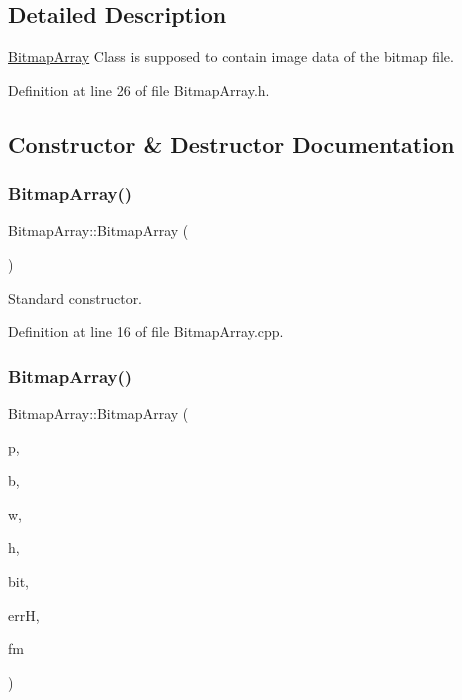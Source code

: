 \subsection{Detailed Description}
\mbox{\hyperlink{classBitmapArray}{Bitmap\+Array}} Class is supposed to contain image data of the bitmap file. 

Definition at line 26 of file Bitmap\+Array.\+h.



\subsection{Constructor \& Destructor Documentation}
\mbox{\label{classBitmapArray_a582e5e54ec078d30fde87ae7b4540f32}} 
\subsubsection{\texorpdfstring{BitmapArray()}{BitmapArray()}\hspace{0.1cm}{\footnotesize\ttfamily [1/4]}}
{\footnotesize\ttfamily Bitmap\+Array\+::\+Bitmap\+Array (\begin{DoxyParamCaption}{ }\end{DoxyParamCaption})}



Standard constructor. 



Definition at line 16 of file Bitmap\+Array.\+cpp.

\mbox{\label{classBitmapArray_ae11059a1f2f1af199d0a2cf6f316397d}} 
\subsubsection{\texorpdfstring{BitmapArray()}{BitmapArray()}\hspace{0.1cm}{\footnotesize\ttfamily [2/4]}}
{\footnotesize\ttfamily Bitmap\+Array\+::\+Bitmap\+Array (\begin{DoxyParamCaption}\item[{std\+::string}]{p,  }\item[{uint32\+\_\+t}]{b,  }\item[{uint32\+\_\+t}]{w,  }\item[{uint32\+\_\+t}]{h,  }\item[{uint32\+\_\+t}]{bit,  }\item[{\mbox{\hyperlink{classErrorHandler}{Error\+Handler}} $\ast$}]{errH,  }\item[{std\+::string}]{fm }\end{DoxyParamCaption})}



